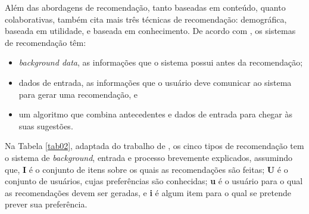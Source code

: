 Além das abordagens de recomendação, tanto baseadas em conteúdo, quanto colaborativas,  também cita mais três técnicas de recomendação: demográfica, baseada em utilidade, e 
baseada em conhecimento. De acordo com , os sistemas de recomendação têm: 

\begin{itemize}

	\item \emph{background data}, as informações que o sistema possui antes da recomendação;

	\item dados de entrada, as informações que o usuário deve comunicar ao
	sistema para gerar uma recomendação, e

	\item um algoritmo que combina antecedentes e dados de entrada para chegar às suas sugestões.

\end{itemize}

Na Tabela \ref{tab02}, adaptada do trabalho de , os cinco tipos de 
recomendação tem o sistema de \emph{background}, entrada e processo brevemente explicados, 
assumindo que, \textbf{I} é o conjunto de itens sobre os quais as recomendações são feitas; \textbf{U} é o conjunto de usuários, cujas preferências são conhecidas; \textbf{u} 
é o usuário para o qual as recomendações devem ser geradas, e \textbf{i} é algum item para o qual se pretende prever sua preferência.

